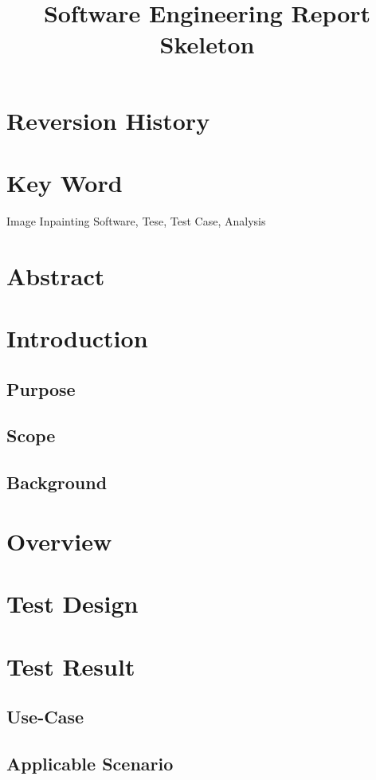 \documentclass[12pt]{article}
\title{Software Engineering Report Skeleton}
\begin{document}
\maketitle

\section*{Reversion History}
\section*{Key Word} Image Inpainting Software, Tese, Test Case, Analysis
\section*{Abstract}
\qquad 

\newpage
\tableofcontents
\newpage

\section{Introduction}
\subsection{Purpose}
\subsection{Scope}
\subsection{Background}

\section{Overview}

\section{Test Design}

\section{Test Result}
\subsection{Use-Case}
\subsection{Applicable Scenario}
\end{document}
